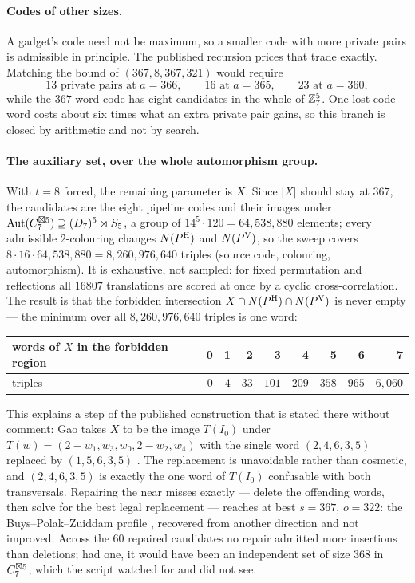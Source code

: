 \paragraph{Codes of other sizes.}
A gadget's code need not be maximum, so a smaller code with more private pairs is admissible
in principle. The published recursion prices that trade exactly. Matching the bound of
$(367,8,367,321)$ would require
\[
  13 \text{ private pairs at } a=366,\qquad
  16 \text{ at } a=365,\qquad
  23 \text{ at } a=360 ,
\]
while the $367$-word code has eight candidates in the whole of $\mathbb{Z}_7^5$. One lost code word
costs about six times what an extra private pair gains, so this branch is closed by
arithmetic and not by search.

\paragraph{The auxiliary set, over the whole automorphism group.}
With $t=8$ forced, the remaining parameter is $X$. Since $|X|$ should stay at $367$, the
candidates are the eight pipeline codes and their images under
$\mathrm{Aut}(C_7^{\boxtimes 5})\supseteq(D_7)^5\rtimes S_5$, a group of
$14^5\cdot 120=64{,}538{,}880$ elements; every admissible $2$-colouring changes $N(P^{\mathrm H})$ and
$N(P^{\mathrm V})$, so the sweep covers $8\cdot 16\cdot 64{,}538{,}880=8{,}260{,}976{,}640$ triples
(source code, colouring, automorphism). It is exhaustive, not sampled: for fixed permutation
and reflections all $16807$ translations are scored at once by a cyclic cross-correlation.
The result is that the forbidden intersection $X\cap N(P^{\mathrm H})\cap N(P^{\mathrm V})$ is never empty ---
the minimum over all $8{,}260{,}976{,}640$ triples is one word:

\begin{center}
\begin{tabular}{@{}lrrrrrrrr@{}}
\toprule
words of $X$ in the forbidden region & 0 & 1 & 2 & 3 & 4 & 5 & 6 & 7 \\
\midrule
triples & $0$ & $4$ & $33$ & $101$ & $209$ & $358$ & $965$ & $6{,}060$ \\
\bottomrule
\end{tabular}
\end{center}

This explains a step of the published construction that is stated there without comment: Gao
takes $X$ to be the image $T(I_0)$ under $T(w)=(2-w_1,w_3,w_0,2-w_2,w_4)$ with the single word
$(2,4,6,3,5)$ replaced by $(1,5,6,3,5)$ \cite{gao2026,tandon2026}. The replacement is
unavoidable rather than cosmetic, and $(2,4,6,3,5)$ is exactly the one word of $T(I_0)$
confusable with both transversals. Repairing the near misses exactly --- delete the offending
words, then solve for the best legal replacement --- reaches at best $s=367$, $o=322$: the
Buys--Polak--Zuiddam profile \cite{bpz2026}, recovered from another direction and not improved.
Across the $60$ repaired candidates no repair admitted more insertions than deletions; had one,
it would have been an independent set of size $368$ in $C_7^{\boxtimes 5}$, which the script watched
for and did not see.

